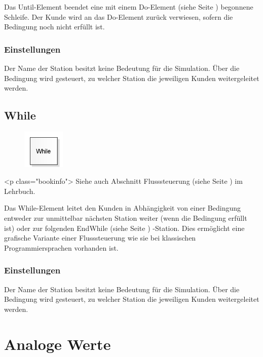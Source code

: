 Das Until-Element beendet eine mit einem
Do-Element (siehe Seite \pageref{ref:ModelElementLogicDo}) begonnene
Schleife. Der Kunde wird an das Do-Element zurück verwiesen,
sofern die Bedingung noch nicht erfüllt ist.

\subsection*{Einstellungen}

Der Name der Station besitzt keine Bedeutung für die Simulation.
Über die Bedingung wird gesteuert, zu welcher Station die jeweiligen Kunden weitergeleitet werden.


\section{While}
\label{ref:ModelElementLogicWhile}

\begin{figure}
\vspace{-22pt}
\includegraphics[width=2cm]{imageModelElementLogicWhile.png}
\vspace{-22pt}
\end{figure}

<p class="bookinfo">
Siehe auch Abschnitt Flusssteuerung (siehe Seite \pageref{ref:book:8.10}) im Lehrbuch.

Das While-Element leitet den Kunden in Abhängigkeit von einer Bedingung entweder
zur unmittelbar nächsten Station weiter (wenn die Bedingung erfüllt ist) oder
zur folgenden EndWhile (siehe Seite \pageref{ref:ModelElementLogicEndWhile}) -Station.
Dies ermöglicht eine grafische Variante einer Flusssteuerung wie sie bei
klassischen Programmiersprachen vorhanden ist.

\subsection*{Einstellungen}

Der Name der Station besitzt keine Bedeutung für die Simulation. Über die Bedingung
wird gesteuert, zu welcher Station die jeweiligen Kunden weitergeleitet werden.





\chapter{Analoge Werte}

